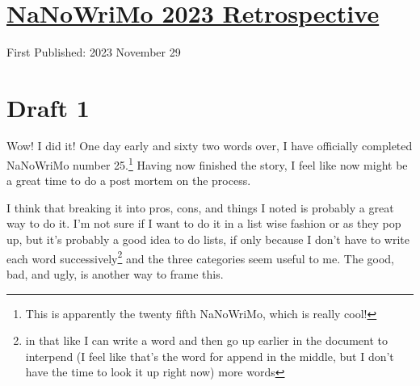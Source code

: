 \documentclass[12pt]{article}[titlepage]
\newcommand{\1}{\={a}}
\newcommand{\2}{\={e}}
\newcommand{\3}{\={\i}}
\newcommand{\4}{\=o}
\newcommand{\5}{\=u}
\newcommand{\6}{\={A}}
\renewcommand{\,}{\textsuperscript{,}}
\begin{document}

\doublespacing
\section{\href{nanowrimo-6.html}{NaNoWriMo 2023 Retrospective}}
First Published: 2023 November 29
\section{Draft 1}
Wow! I did it!
One day early and sixty two words over, I have officially completed NaNoWriMo number 25.\footnote{This is apparently the twenty fifth NaNoWriMo, which is really cool!}
Having now finished the story, I feel like now might be a great time to do a post mortem on the process.
 
I think that breaking it into pros, cons, and things I noted is probably a great way to do it.
I'm not sure if I want to do it in a list wise fashion or as they pop up, but it's probably a good idea to do lists, if only because I don't have to write each word successively\footnote{in that like I can write a word and then go up earlier in the document to interpend (I feel like that's the word for append in the middle, but I don't have the time to look it up right now) more words} and the three categories seem useful to me.
The good, bad, and ugly, is another way to frame this.
 
\end{document}
